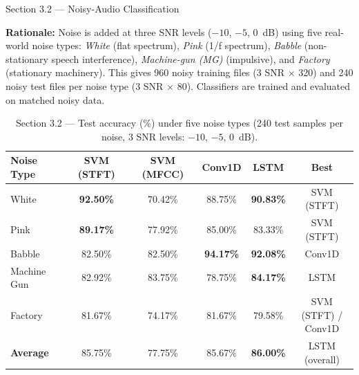 \documentclass[12pt,a4paper,onecolumn]{exam}
\newcommand{\questionheader}[1]{%
  \begin{tcolorbox}[
    enhanced,
    colback=black,
    coltext=white,
    boxrule=0pt,
    fontupper=\Large\bfseries,
    arc=4mm
  ]
  #1
  \end{tcolorbox}%
}
\newcommand{\best}[1]{\cellcolor{bestcol}\textbf{#1}}
\begin{document}
\questionheader{Section 3.2 --- Noisy-Audio Classification}

\noindent\textbf{Rationale:}
Noise is added at three SNR levels ($-10$, $-5$, $0$~dB) using five real-world noise types:
\emph{White} (flat spectrum), \emph{Pink} (1/f spectrum), \emph{Babble}
(non-stationary speech interference), \emph{Machine-gun (MG)} (impulsive),
and \emph{Factory} (stationary machinery).
This gives 960 noisy training files (3 SNR $\times$ 320) and 240 noisy test files per noise type (3 SNR $\times$ 80).
Classifiers are trained and evaluated on matched noisy data.

\begin{table}[H]
\centering
\caption{Section 3.2 --- Test accuracy (\%) under five noise types (240 test samples per noise, 3 SNR levels: $-10$, $-5$, $0$~dB).}
\label{tab:32}
\small\setlength{\tabcolsep}{5pt}
\begin{tabular}{lccccc}
\toprule
\textbf{Noise Type} & \textbf{SVM (STFT)} & \textbf{SVM (MFCC)} & \textbf{Conv1D} & \textbf{LSTM} & \textbf{Best} \\
\midrule
White         & \best{92.50\%} & 70.42\%        & 88.75\%        & \best{90.83\%}        & SVM (STFT) \\
Pink          & \best{89.17\%} & 77.92\%        & 85.00\%        & 83.33\%        & SVM (STFT) \\
Babble        & 82.50\%        & 82.50\%        & \best{94.17\%} & \best{92.08\%}        & Conv1D \\
Machine Gun   & 82.92\%        & 83.75\%        & 78.75\%        & \best{84.17\%} & LSTM \\
Factory       & 81.67\%        & 74.17\%        & 81.67\%        & 79.58\%        & \makecell{SVM (STFT) /\\ Conv1D} \\
\midrule
\textbf{Average} & 85.75\% & 77.75\% & 85.67\% & \best{86.00\%} & LSTM (overall) \\
\bottomrule
\end{tabular}
\end{table}
\end{document}
